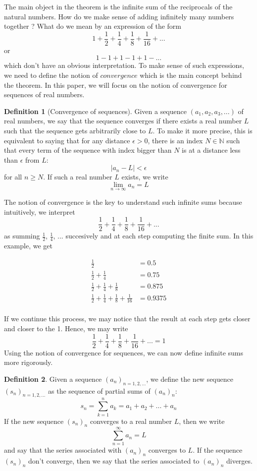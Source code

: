 \documentclass[10pt]{article}
\newcommand{\N}{\mathbb{N}}
\theoremstyle{definition}
\newtheorem*{definition}{Definition}
\begin{document}
The main object in the theorem is the infinite sum of the reciprocals of the natural numbers. How do we make sense of adding infinitely many numbers together ? What do we mean by an expression of the form
$$1 + \frac{1}{2} + \frac{1}{4} + \frac{1}{8} + \frac{1}{16} + ...$$
or 
$$1 - 1 + 1 - 1 + 1 - ...$$
which don't have an obvious interpretation. To make sense of such expressions, we need to define the notion of $\textit{convergence}$ which is the main concept behind the theorem. In this paper, we will focus on the notion of convergence for sequences of real numbers.

\begin{definition}[Convergence of sequences]
    Given a sequence $(a_1, a_2, a_3, ...)$ of real numbers, we say that the sequence converges if there exists a real number $L$ such that the sequence gets arbitrarily close to $L$. To make it more precise, this is equivalent to saying that for any distance $\epsilon > 0$, there is an index $N \in \N$ such that every term of the sequence with index bigger than $N$ is at a distance less than $\epsilon$ from $L$:
    $$|a_n - L| < \epsilon$$
    for all $n \geq N$. If such a real number $L$ exists, we write 
    $$\lim_{n \rightarrow \infty} a_n = L$$
\end{definition}

The notion of convergence is the key to understand such infinite sums because intuitively, we interpret 
$$\frac{1}{2} + \frac{1}{4} + \frac{1}{8} + \frac{1}{16}  + ...$$
as summing $\frac{1}{2}$, $\frac{1}{4}$, ... succesively and at each step computing the finite sum. In this example, we get

\begin{align*}
    \frac{1}{2} &= 0.5 \\
    \frac{1}{2} + \frac{1}{4} &= 0.75 \\
    \frac{1}{2} + \frac{1}{4} + \frac{1}{8} &= 0.875 \\
    \frac{1}{2} + \frac{1}{4} + \frac{1}{8} + \frac{1}{16} &= 0.9375 \\
\end{align*}

If we continue this process, we may notice that the result at each step gets closer and closer to the 1. Hence, we may write
$$\frac{1}{2} + \frac{1}{4} + \frac{1}{8} + \frac{1}{16} + ... = 1$$
Using the notion of convergence for sequences, we can now define infinite sums more rigorously.

\begin{definition}
    Given a sequence $(a_n)_{n=1,2,...}$, we define the new sequence $(s_n)_{n=1,2,...}$ as the sequence of partial sums of $(a_n)_n$:
    $$s_n = \sum_{k=1}^{n}a_k = a_1 + a_2 + ... + a_n$$
    If the new sequence $(s_n)_n$ converges to a real number $L$, then we write
    $$\sum_{n=1}^{\infty}a_n = L$$
    and say that the series associated with $(a_n)_n$ converges to $L$. If the sequence $(s_n)_n$ don't converge, then we say that the series associated to $(a_n)_n$ diverges.
\end{definition}
\end{document}
